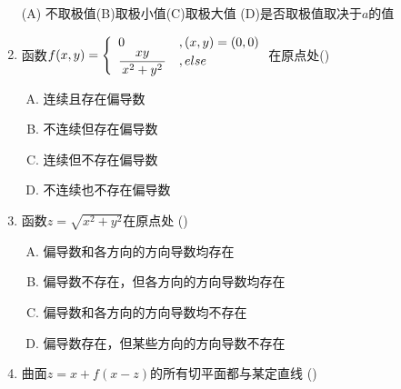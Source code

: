 \begin{enumerate}
  (A) 不取极值\quad{1cm}(B)取极小值\quad (C)取极大值\quad
  (D)是否取极值取决于$a$的值
  \item 函数$f(x,y)=\left\{\begin{array}{ll}
  0&,(x,y)=(0,0)\\
  \displaystyle\frac{\,{xy}\,}{\,{x^2+y^2}\,}&,else
  \end{array}\right.$在原点处(\underline{\hspace{1cm}})
  \begin{enumerate}[(A)]
    \item 连续且存在偏导数
    \item 不连续但存在偏导数
    \item 连续但不存在偏导数
    \item 不连续也不存在偏导数
  \end{enumerate}
  \item 函数$z=\sqrt{x^2+y^2}$在原点处 
  (\underline{\hspace{1cm}})
  \begin{enumerate}[(A)]
    \item 偏导数和各方向的方向导数均存在
    \item 偏导数不存在，但各方向的方向导数均存在
    \item 偏导数和各方向的方向导数均不存在
    \item 偏导数存在，但某些方向的方向导数不存在
  \end{enumerate}
  \item 曲面$z=x+f(x-z)$的所有切平面都与某定直线
  (\underline{\hspace{1cm}})
  

\end{enumerate}
